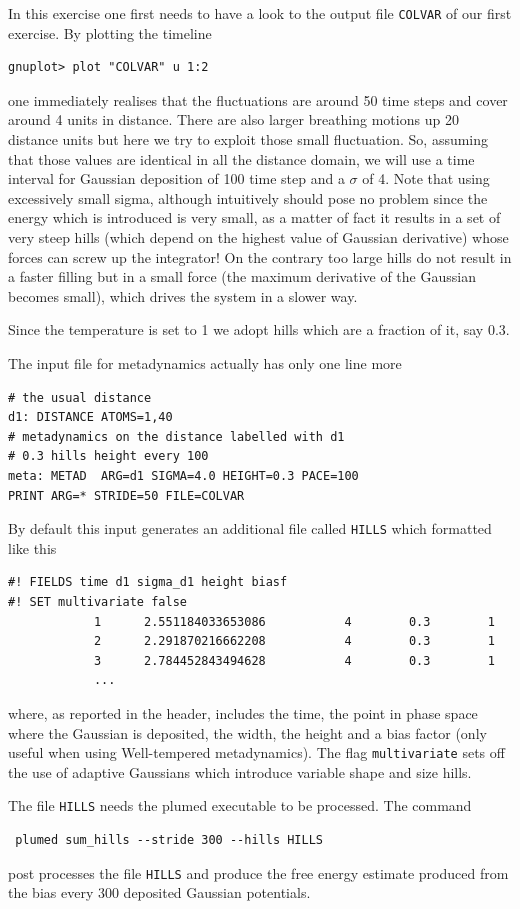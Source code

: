 \documentclass[10pt,fleqn,a4paper]{report}
\begin{document}
In this exercise one first needs to have a look to the output file \texttt{COLVAR} of our first exercise. By plotting the timeline
\begin{verbatim}
gnuplot> plot "COLVAR" u 1:2
\end{verbatim}
one immediately realises that the fluctuations are around 50 time steps and cover around 4 units in distance. There are also larger breathing motions up 20 distance units but here we try to exploit those small fluctuation. So, assuming that those values are identical in all the distance domain, we will use a time interval for Gaussian deposition of 100 time step and a $\sigma$ of 4.  
Note that using excessively small sigma, although intuitively should pose no problem since the energy which is introduced is very small, as a matter of fact it results in a set of very steep hills (which depend on the highest value of Gaussian derivative) whose forces can screw up the integrator! On the contrary too large hills do not result in a faster filling but in a small force (the maximum derivative of the Gaussian becomes small), which drives the system in a slower way.  

Since the temperature is set to 1 we adopt hills which are a fraction of it, say 0.3.

The input file for metadynamics actually has only one line more 
\begin{verbatim}
# the usual distance
d1: DISTANCE ATOMS=1,40
# metadynamics on the distance labelled with d1
# 0.3 hills height every 100 
meta: METAD  ARG=d1 SIGMA=4.0 HEIGHT=0.3 PACE=100
PRINT ARG=* STRIDE=50 FILE=COLVAR
\end{verbatim}

By default this input generates an additional file called \texttt{HILLS}
which formatted like this
\begin{verbatim}
#! FIELDS time d1 sigma_d1 height biasf
#! SET multivariate false
            1      2.551184033653086           4        0.3        1
            2      2.291870216662208           4        0.3        1
            3      2.784452843494628           4        0.3        1
            ...
\end{verbatim}
where, as reported in the header, includes the time, the point in phase space where the
Gaussian is deposited, the width, the height and a bias factor (only useful when using Well-tempered metadynamics). The flag \texttt{multivariate} sets off the use of adaptive Gaussians
which introduce variable shape and size hills.

The file \texttt{HILLS} needs the plumed executable to be processed.
The command
\begin{verbatim}
 plumed sum_hills --stride 300 --hills HILLS
\end{verbatim}
post processes the file \texttt{HILLS} and produce the free energy estimate produced from the bias every 300 deposited Gaussian potentials. 
\end{document}
